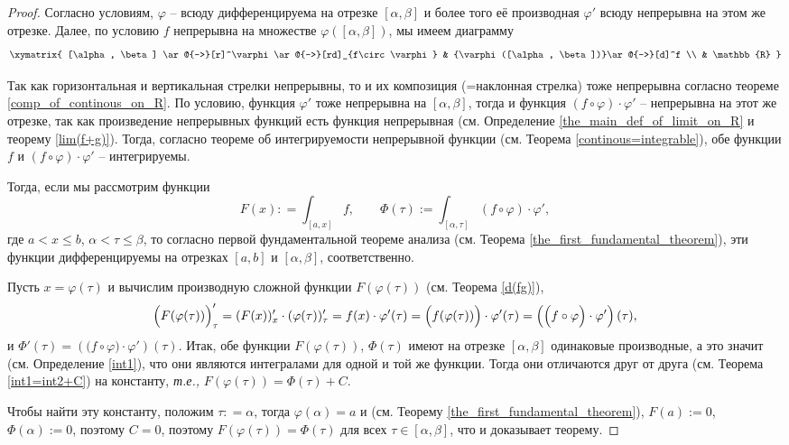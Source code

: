 \begin{proof}
Согласно условиям, $\varphi$ -- всюду дифференцируема на отрезке $[\alpha, \beta]$ и более того её производная $\varphi'$ всюду непрерывна на этом же отрезке. Далее, по условию $f$ непрерывна на множестве $\varphi([\alpha, \beta])$, мы имеем диаграмму
\[
 \xymatrix{
 [\alpha, \beta] \ar@{->}[r]^\varphi \ar@{->}[rd]_{f\circ \varphi} & {\varphi([\alpha, \beta])}\ar@{->}[d]^f \\
 & \mathbb{R}
 }
\]

Так как горизонтальная и вертикальная стрелки непрерывны, то и их композиция (=наклонная стрелка) тоже непрерывна согласно теореме \ref{comp_of_continous_on_R}. По условию, функция $\varphi'$ тоже непрерывна на $[\alpha, \beta]$, тогда и функция $(f \circ \varphi)\cdot \varphi'$ -- непрерывна на этот же отрезке, так как произведение непрерывных функций есть функция непрерывная (см. Определение \ref{the_main_def_of_limit_on_R} и теорему \ref{lim(f+g)}). Тогда, согласно теореме об интегрируемости непрерывной функции (см. Теорема \ref{continous=integrable}), обе функции $f$ и $(f \circ \varphi)\cdot \varphi'$ -- интегрируемы.

Тогда, если мы рассмотрим функции
\[
 F(x): = \int_{[a,x]}f, \qquad \Phi(\tau):=\int_{[\alpha, \tau]} (f\circ \varphi)\cdot \varphi',
\]
где $a<x \le b$, $\alpha < \tau \le \beta$, то согласно первой фундаментальной теореме анализа (см. Теорема \ref{the_first_fundamental_theorem}), эти функции дифференцируемы на отрезках $[a,b]$ и $[\alpha,\beta]$, соответственно.

Пусть $x = \varphi(\tau)$ и вычислим производную сложной функции $F(\varphi(\tau))$ (см. Теорема \ref{d(fg)}),
\[
 \Bigl(F(\varphi(\tau))\Bigr)'_\tau = (F(x))'_x\cdot (\varphi(\tau))'_\tau = f(x)\cdot \varphi'(\tau) = \Bigl(f(\varphi(\tau)) \Bigr)\cdot \varphi'(\tau) = \left(\Bigl( f\circ \varphi \Bigr)\cdot \varphi'\right)(\tau),
\]
и $\Phi'(\tau) = \left(\bigl( f\circ \varphi \bigr)\cdot \varphi'\right)(\tau)$. Итак, обе функции $F(\varphi(\tau))$, $\Phi(\tau)$ имеют на отрезке $[\alpha, \beta]$ одинаковые производные, а это значит (см. Определение \ref{int1}), что они являются интегралами для одной и той же функции. Тогда они отличаются друг от друга (см. Теорема \ref{int1=int2+C}) на константу, \textit{т.е.,} $F(\varphi(\tau)) = \Phi(\tau) + C$. 

Чтобы найти эту константу, положим $\tau: = \alpha$, тогда $\varphi(\alpha) = a$ и (см. Теорему \ref{the_first_fundamental_theorem}), $F(a):=0$, $\Phi(\alpha):=0$, поэтому $C=0$, поэтому $F(\varphi(\tau)) = \Phi(\tau)$ для всех $\tau \in [\alpha,\beta]$, что и доказывает теорему.
\end{proof}


